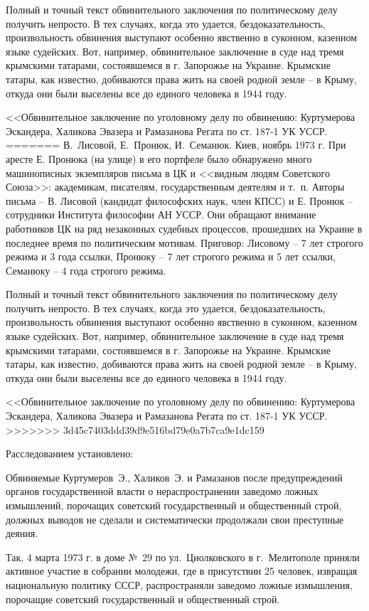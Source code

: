 \documentclass{book}
\begin{document}
Полный и точный текст обвинительного заключения по политическому делу получить непросто. В тех случаях, когда это удается, бездоказательность, произвольность обвинения выступают особенно явственно в суконном, казенном языке судейских. Вот, например, обвинительное заключение в суде над тремя крымскими татарами, состоявшемся в г. Запорожье на Украине. Крымские татары, как известно, добиваются права жить на своей родной земле -- в Крыму, откуда они были выселены все до единого человека в 1944 году.

<<Обвинительное заключение по уголовному делу по обвинению: Куртумерова Эскандера, Халикова Эвазера и Рамазанова Регата по ст. 187‑1 УК УССР.
=======
В.~Лисовой, Е.~Пронюк, И.~Семанюк. Киев, ноябрь 1973 г. При аресте Е. Пронюка (на улице) в его портфеле было обнаружено много машинописных экземпляров письма в ЦК и <<видным людям Советского Союза>>: академикам, писателям, государственным деятелям и т.~п. Авторы письма -- В. Лисовой (кандидат философских наук, член КПСС) и Е. Пронюк -- сотрудники Института философии АН УССР. Они обращают внимание работников ЦК на ряд незаконных судебных про­цессов, прошедших на Украине в последнее время по политическим мотивам. Приговор: Лисовому -- 7 лет строгого режи­ма и 3 года ссылки, Пронюку -- 7 лет строгого режима и 5 лет ссылки, Семанюку -- 4 года строгого режима.

Полный и точный текст обвинительного заключения по политическому делу получить непросто. В тех случаях, когда это удается, бездоказательность, произвольность обвинения выступают особенно явственно в суконном, казенном языке судейских. Вот, например, обвинительное заключение в суде над тремя крымскими татарами, состоявшемся в г. Запорожье на Украине. Крымские татары, как известно, добиваются права жить на своей родной земле -- в Крыму, откуда они были выселены все до единого человека в 1944 году.

<<Обвинительное заключение по уголовному делу по обвинению: Куртумерова Эскандера, Халикова Эвазера и Рамазанова Регата по ст. 187-1 УК УССР.
>>>>>>> 3d45c7403ddd39d9e516bd79e0a7b7ca9e1dc159

Расследованием установлено:

Обвиняемые Куртумеров~Э., Халиков~Э. и Рамазанов после предупреждений органов государственной власти о нераспространении заведомо ложных измышлений, порочащих советский государственный и общественный строй, должных выводов не сделали и систематически продолжали свои преступные деяния.

Так, 4 марта 1973 г. в доме №~29 по ул.~Циолковского в г.~Мелитополе приняли активное участие в собрании молодежи, где в присутствии 25 человек, извращая национальную политику СССР, распространяли заведомо ложные измышления, порочащие советский государственный и общественный строй.
\end{document}
